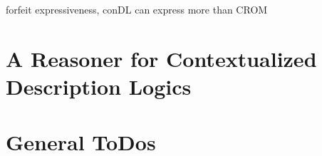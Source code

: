 forfeit expressiveness, conDL can express more than CROM


\blindtext 


\section{A Reasoner for Contextualized Description Logics}
\label{sec:intro-reasoner}


\blindtext




\clearpage

\section{General ToDos}
\label{sec:todos}





